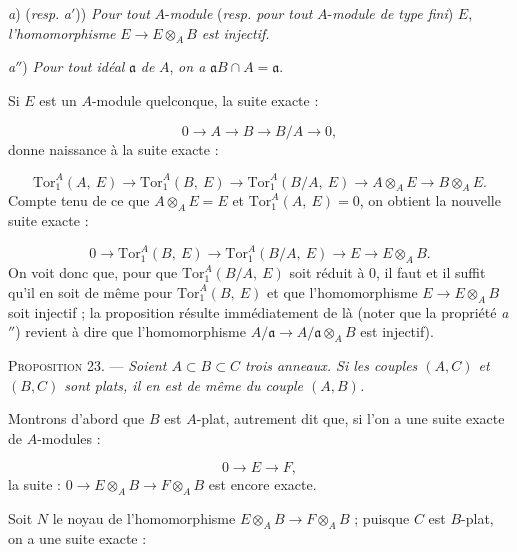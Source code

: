 \textit{a}) (\textit{resp}. \textit{a}$'$)) \textit{Pour tout} $A$-\textit{module} (\textit{resp. pour tout} $A$-\textit{module de type fini}) $E$, \textit{l'homomorphisme} $E \to E \otimes_A B$ \textit{est injectif.}

\textit{a}$''$) \textit{Pour tout idéal} $\mathfrak{a}$ \textit{de} $A$, \textit{on a} $\mathfrak{a}B \cap A = \mathfrak{a}$.

Si $E$ est un $A$-module quelconque, la suite exacte :

\begin{equation*}
0 \to A \to B \to B/A \to 0,
\end{equation*}
donne naissance à la suite exacte :

\begin{equation*}
\mathrm{Tor}_1^{A}(A,\ E) \to \mathrm{Tor}_1^{A}(B,\ E) \to \mathrm{Tor}_1^{A}(B/A,\ E) \to A \otimes_A E \to B \otimes_A E.
\end{equation*}
Compte tenu de ce que $A \otimes_A E = E$ et $\mathrm{Tor}_1^{A}(A,\ E) = 0$, on obtient la nouvelle suite exacte :

\begin{equation*}
0 \to \mathrm{Tor}_1^{A}(B,\ E) \to \mathrm{Tor}_1^{A}(B/A,\ E) \to E \to E \otimes_A B.
\end{equation*}
On voit donc que, pour que $\mathrm{Tor}_1^{A}(B/A,\ E)$ soit réduit à $0$, il faut et il suffit qu'il en soit de même pour $\mathrm{Tor}_1^{A}(B,\ E)$ et que l'homomorphisme $E \to E \otimes_A B$ soit injectif ; la proposition résulte immédiatement de là (noter que la propriété \textit{a}$''$) revient à dire que l'homomorphisme $A/\mathfrak{a} \to A/\mathfrak{a} \otimes_A B$ est injectif).



\textsc{Proposition 23}. --- \emph{Soient $A \subset B \subset C$ trois anneaux. Si les couples $(A, C)$ et $(B, C)$ sont plats, il en est de même du couple $(A, B)$.}

Montrons d'abord que $B$ est $A$-plat, autrement dit que, si l'on a une suite exacte de $A$-modules :

\begin{equation*}
0 \to E \to F,
\end{equation*}
la suite : $0 \to E \otimes_A B \to F \otimes_A B$ est encore exacte.

Soit $N$ le noyau de l'homomorphisme $E \otimes_A B \to F \otimes_A B$ ; puisque $C$ est $B$-plat, on a une suite exacte :

